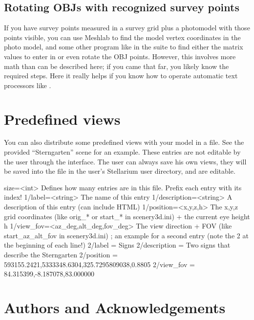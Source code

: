 \subsection{Rotating OBJs with recognized survey points}
\label{sec:scenery3d:RotatingOBJ}

If you have survey points measured in a survey grid plus a photomodel
with those points visible, you can use Meshlab to find the model
vertex coordinates in the photo model, and some other program like
 in the  suite to find either the matrix
values to enter in  or even rotate the OBJ
points. However, this involves more math than can be described here;
if you came that far, you likely know the required steps.  Here it
really helps if you know how to operate automatic text processors like
.

\section{Predefined views}
You can also distribute some predefined views with your model in a
 file. See the provided ``Sterngarten'' scene for an
example. These entries are not editable by the user through the interface. The
user can always save his own views, they will be saved into the file
 in the user's Stellarium user directory, and are editable.

\begin{configfile}[\scriptsize]
[StoredViews]
size=<int>              Defines how many entries are in this file. 
                        Prefix each entry with its index!
1/label=<string>        The name of this entry
1/description=<string>  A description of this entry (can include HTML)
1/position=<x,y,z,h>    The x,y,z grid coordinates 
                        (like orig_* or start_* in scenery3d.ini) 
                        + the current eye height h
1/view_fov=<az_deg,alt_deg,fov_deg>  The view direction + FOV
                                     (like start_az_alt_fov in scenery3d.ini)
; an example for a second entry (note the 2 at the beginning of each line!)
2/label       = Signs
2/description = Two signs that describe the Sterngarten
2/position    = 593155.2421,5333348.6304,325.7295809038,0.8805
2/view_fov    = 84.315399,-8.187078,83.000000
\end{configfile}


\section*{Authors and Acknowledgements}
\label{sec:scenery3d:Acknowledgments}


